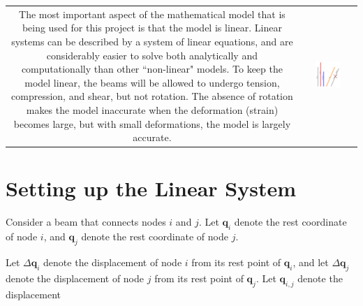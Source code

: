 \documentclass{article}
\begin{document}
\begin{center}
\begin{tabular}{cc}
\parbox{0.5\textwidth}{
The most important aspect of the mathematical model that is being used for this project is that the model is linear. Linear systems can be described by a system of linear equations, and are considerably easier to solve both analytically and computationally than other ``non-linear" models. To keep the model linear, the beams will be allowed to undergo tension, compression, and shear, but not rotation. The absence of rotation makes the model inaccurate when the deformation (strain) becomes large, but with small deformations, the model is largely accurate. 
} & \parbox{0.5\textwidth}{
\includegraphics[width = 0.5\textwidth]{tension_compression_shear_no_rotation}
}
\end{tabular}
\end{center}



\section{Setting up the Linear System}

Consider a beam that connects nodes \(i\) and \(j\). Let \(\mathbf{q}_i\) denote the rest coordinate of node \(i\), and \(\mathbf{q}_j\) denote the rest coordinate of node \(j\). 

Let \(\Delta\mathbf{q}_i\) denote the displacement of node \(i\) from its rest point of \(\mathbf{q}_i\), and let \(\Delta\mathbf{q}_j\) denote the displacement of node \(j\) from its rest point of \(\mathbf{q}_j\). Let \(\mathbf{q}_{i,j}\) denote the displacement 
\end{document}
